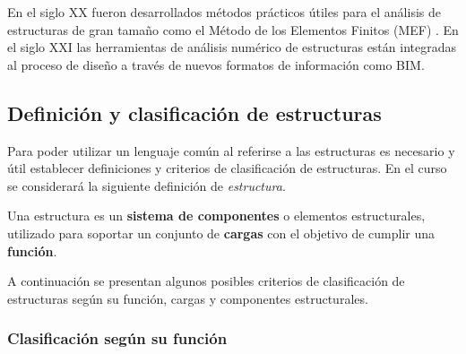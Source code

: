 En el siglo XX fueron desarrollados métodos prácticos útiles para el análisis de estructuras de gran tamaño como el Método de los Elementos Finitos (MEF) \citep{Zienkiewicz1972}. %
%
En el siglo XXI las herramientas de análisis numérico de estructuras están integradas al proceso de diseño a través de nuevos formatos de información como BIM.


\subsection{Definición y clasificación de estructuras}

% 
Para poder utilizar un lenguaje común al referirse a las estructuras es necesario y útil establecer definiciones y criterios de clasificación de estructuras. %
%
En el curso se considerará la siguiente definición de \textit{estructura}.


{Una estructura es un \textbf{sistema de componentes} o elementos estructurales, utilizado para soportar un conjunto de \textbf{cargas} con el objetivo de cumplir una \textbf{función}.}

A continuación se presentan algunos posibles criterios de clasificación de estructuras según su función, cargas y componentes estructurales. %
%


\subsubsection{Clasificación según su función}

